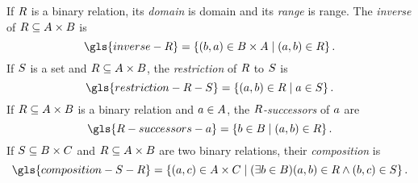 
If $R$ is a binary relation, its \emph{domain} is \gls{domain} and its
\emph{range} is \gls{range}.
The \emph{inverse} of $R \subseteq A \times B$ is 
\[
  \gls{inverse-R} = 
  \setbd{(\eb, \ea) \in \setB \cprod \setA}{(\ea, \eb) \in \relR}.
\]
If $S$ is a set and $R \subseteq A \times B$, the
\emph{restriction} of $R$ to $S$ is
\[
  \gls{restriction-R-S} =
  \setbd{(\ea, \eb) \in \relR}{\ea \in \setS}.
\]
If $R \subseteq A \times
B$ is a binary relation and $a \in A$, the \emph{$R$-successors} 
of $a$ are
\[
  \gls{R-successors-a} =
  \setbd{\eb \in \setB}{(\ea, \eb) \in \relR}.
\]
If $S \subseteq B \times C$ and $R \subseteq A \times B$
are two binary relations, their \emph{composition} is 
\[
  \gls{composition-S-R} =
  \setbd{(\ea, \ec) \in \setA \cprod \setC}{(\exists \eb \in \setB) (\ea, \eb)
  \in \relR \land (\eb, \ec) \in \relS}.
\]